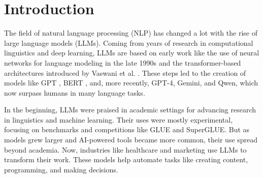 \documentclass[fleqn,10pt]{SelfArx} %
\begin{document}
\maketitle %

\tableofcontents %

\thispagestyle{empty} %


\section*{Introduction} %






The field of natural language processing (NLP) has changed a lot with the rise of large language models (LLMs). Coming from years of research in computational linguistics and deep learning, LLMs are based on early work like the use of neural networks for language modeling in the late 1990s and the transformer-based architectures introduced by Vaswani et al. \cite{Vaswani:2017at}. These steps led to the creation of models like GPT \cite{Radford:2018tf}, BERT \cite{Devlin:2018br}, and, more recently, GPT-4, Gemini, and Qwen, which now surpass humans in many language tasks.

In the beginning, LLMs were praised in academic settings for advancing research in linguistics and machine learning. Their uses were mostly experimental, focusing on benchmarks and competitions like GLUE and SuperGLUE. But as models grew larger and AI-powered tools became more common, their use spread beyond academia. Now, industries like healthcare and marketing use LLMs to transform their work. These models help automate tasks like creating content, programming, and making decisions.
\end{document}
